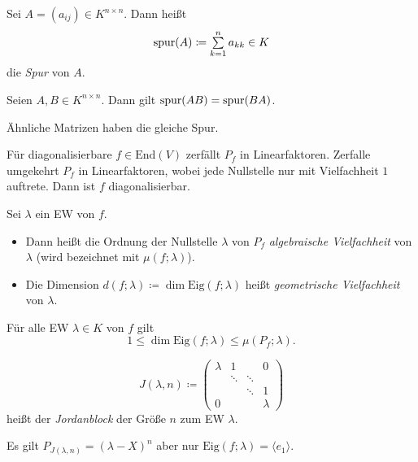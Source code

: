 \documentclass{cheat-sheet}
\newcommand{\End}{\mathrm{End}}
\newcommand{\Eig}{\mathrm{Eig}}
\begin{document}
\begin{defn}
Sei $A = (a_{ij}) \in K^{n \times n}$. Dann heißt
\[ \spur(A) \coloneqq \sum_{k=1}^n a_{kk} \in K \]
die \emph{Spur} von $A$.
\end{defn}

\begin{satz}
Seien $A, B \in K^{n \times n}$. Dann gilt $\mathrm{spur}(AB) = \mathrm{spur}(BA)$.
\end{satz}

\begin{kor}
Ähnliche Matrizen haben die gleiche Spur.
\end{kor}

\begin{satz}
Für diagonalisierbare $f \in \End(V)$ zerfällt $P_f$ in Linearfaktoren. Zerfalle umgekehrt $P_f$ in Linearfaktoren, wobei jede Nullstelle nur mit Vielfachheit $1$ auftrete. Dann ist $f$ diagonalisierbar.
\end{satz}

\begin{defn}
Sei $\lambda$ ein EW von $f$.
\begin{itemize}
  \item Dann heißt die Ordnung der Nullstelle $\lambda$ von $P_f$ \emph{algebraische Vielfachheit} von $\lambda$ (wird bezeichnet mit $\mu(f; \lambda)$).
  \item Die Dimension $d(f; \lambda) \coloneqq \dim \Eig(f; \lambda)$ heißt \emph{geometrische Vielfachheit} von $\lambda$.
\end{itemize}
\end{defn}

\begin{satz}
Für alle EW $\lambda \in K$ von $f$ gilt
\[ 1 \le \dim \Eig(f; \lambda) \le \mu(P_f; \lambda). \]
\end{satz}

\begin{defn}
\[ J(\lambda, n) \coloneqq \begin{pmatrix}
  \lambda & 1 & & 0 \\
  & \ddots & \ddots & \\
  & & \ddots & 1 \\
  0 & & & \lambda
\end{pmatrix} \]
heißt der \emph{Jordanblock} der Größe $n$ zum EW $\lambda$.
\end{defn}

\begin{bem}
Es gilt $P_{J(\lambda, n)} = (\lambda - X)^n$ aber nur $\Eig(f; \lambda) = \langle e_1 \rangle$.
\end{bem}
\end{document}
